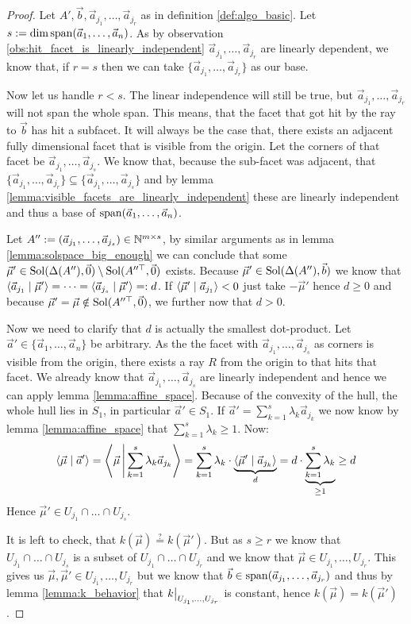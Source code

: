 \begin{proof}
    Let $A', \vec b, \vec a_{j_1}, \dots, \vec a_{j_r}$ as in definition \ref{def:algo_basic}. Let $s := \dim\operatorname{span}(\vec a_1, \dots, \vec a_n)$. As by observation \ref{obs:hit_facet_is_linearly_independent} $\vec a_{j_1}, \dots, \vec a_{j_r}$ are linearly dependent, we know that, if $r = s$ then we can take $\{\vec a_{j_1}, \dots, \vec a_{j_r}\}$ as our base.
    
    Now let us handle $r < s$. The linear independence will still be true, but $\vec a_{j_1}, \dots, \vec a_{j_r}$ will not span the whole span. This means, that the facet that got hit by the ray to $\vec b$ has hit a subfacet. It will always be the case that, there exists an adjacent fully dimensional facet that is visible from the origin. Let the corners of that facet be $\vec a_{j_1}, \dots, \vec a_{j_s}$. We know that, because the sub-facet was adjacent, that $\{\vec a_{j_1}, \dots, \vec a_{j_r}\} \subseteq \{\vec a_{j_1}, \dots, \vec a_{j_s}\}$ and by lemma \ref{lemma:visible_facets_are_linearly_independent} these are linearly independent and thus a base of $\operatorname{span}(\vec a_1, \dots, \vec a_n)$. 

    Let $A'' := (\vec a_{j_1}, \dots, \vec a_{j_s}) \in \mathbb{N}^{m\times s}$, by similar arguments as in lemma \ref{lemma:solspace_big_enough} we can conclude that some $\vec\mu' \in \operatorname{Sol}(\Delta(A''), \vec 0) \setminus \operatorname{Sol}(A''^\top, \vec 0)$ exists. Because $\vec\mu' \in \operatorname{Sol}(\Delta(A''), \vec b)$ we know that $\langle \vec a_{j_1} \mid \vec\mu' \rangle = \dots = \langle \vec a_{j_s} \mid \vec\mu' \rangle =: d$. If $\langle \vec\mu' \mid \vec a_{j_1} \rangle < 0$ just take $-\vec\mu'$ hence $d \geq 0$ and because $\vec\mu' = \vec\mu \notin \operatorname{Sol}(A''^\top, \vec 0)$, we further now that $d > 0$.

    Now we need to clarify that $d$ is actually the smallest dot-product. Let $\vec a' \in \{\vec a_1, \dots, \vec a_n\}$ be arbitrary. As the the facet with $\vec a_{j_1}, \dots, \vec a_{j_s}$ as corners is visible from the origin, there exists a ray $R$ from the origin to that hits that facet. We already know that $\vec a_{j_1}, \dots, \vec a_{j_s}$ are linearly independent and hence we can apply lemma \ref{lemma:affine_space}. Because of the convexity of the hull, the whole hull lies in $S_1$, in particular $\vec a' \in S_1$. If $\vec a' = \sum_{k=1}^s \lambda_k \vec a_{j_k}$ we now know by lemma \ref{lemma:affine_space} that $\sum_{k=1}^s \lambda_k \geq 1$. Now:
    $$\langle \vec\mu \mid \vec a' \rangle = \left\langle \vec\mu \,\middle|\, \sum_{k=1}^s \lambda_k \vec a_{j_k} \right\rangle = \sum_{k=1}^s\lambda_k \cdot \underbrace{\langle \vec\mu' \mid \vec a_{j_k} \rangle}_d = d\cdot \underbrace{\sum_{k=1}^s\lambda_k}_{\geq 1} \geq d$$
    Hence $\vec\mu' \in U_{j_1} \cap \dots \cap U_{j_s}$. 
    
    It is left to check, that $k(\vec\mu) \stackrel{?}{=} k(\vec\mu')$. But as $s \geq r$ we know that $U_{j_1} \cap \dots \cap U_{j_s}$ is a subset of $U_{j_1} \cap \dots \cap U_{j_r}$ and we know that $\vec\mu \in U_{j_1}, \dots, U_{j_r}$. This gives us $\vec\mu, \vec\mu' \in U_{j_1}, \dots, U_{j_r}$ but we know that $\vec b \in \operatorname{span}(\vec a_{j_1}, \dots, \vec a_{j_r})$ and thus by lemma \ref{lemma:k_behavior} that $\restrict{k}{U_{j_1}, \dots, U_{j_r}}$ is constant, hence $k(\vec\mu) = k(\vec\mu')$.
\end{proof}
